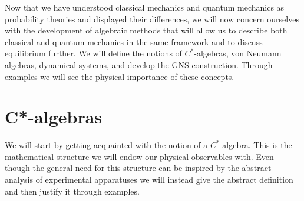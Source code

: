 Now that we have understood classical mechanics and quantum mechanics as probability theories and displayed their differences, we will now concern ourselves with the development of algebraic methods that will allow us to describe both classical and quantum mechanics in the same framework and to discuss equilibrium further. We will define the notions of $C^*$-algebras, von Neumann algebras, dynamical systems, and develop the GNS construction. Through examples we will see the physical importance of these concepts. 
 
\section{C*-algebras}

We will start by getting acquainted with the notion of a $C^*$-algebra. This is the mathematical structure we will endow our physical observables with. Even though the general need for this structure can be inspired by the abstract analysis of experimental apparatuses\cite{Strocchi2008a} we will instead give the abstract definition and then justify it through examples. 

